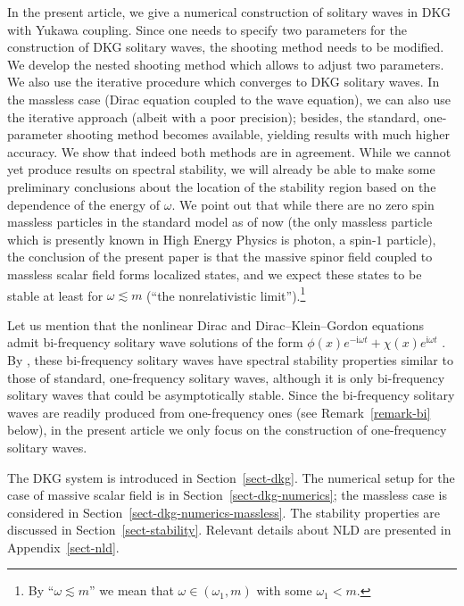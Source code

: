 \documentclass[12pt]{extarticle}
\newcommand{\jj}{\mathrm{i}}
\theoremstyle{plain}
\theoremstyle{remark}
\begin{document}
In the present article,
we give a numerical construction
of solitary waves
in DKG with Yukawa coupling.
Since one needs to specify two parameters
for the construction of DKG solitary waves,
the shooting method needs to be modified.
We develop the nested shooting method
which allows to adjust two parameters.
We also use the iterative procedure
which converges to DKG solitary waves.
In the massless case
(Dirac equation coupled to the wave equation),
we can also use the iterative approach
(albeit with a poor precision);
besides, the standard,
one-parameter shooting method
becomes available,
yielding results with much higher
accuracy.
We show that indeed both methods
are in agreement.
While we cannot yet produce
results on spectral stability,
we will already be able to make
some preliminary conclusions
about the location of the stability region
based on the dependence of the energy
of $\omega$.
We point out that while
there are no zero spin massless particles
in the standard model as of now
(the only massless particle
which is presently known
in High Energy Physics
is photon, a spin-$1$ particle),
the conclusion of the present paper is that
the massive spinor field coupled to massless
scalar field
forms localized states,
and we expect these states
to be stable
at least for
$\omega\lesssim m$
(``the nonrelativistic limit'').\footnote{
By ``$\omega\lesssim m$'' we mean that
$\omega\in(\omega_1,m)$
with some $\omega_1<m$.
}


Let us mention that the nonlinear Dirac and Dirac--Klein--Gordon equations
admit bi-frequency solitary wave solutions
of the form
$\phi(x)e^{-\jj\omega t} + \chi(x)e^{\jj\omega t}$
\cite{boussaid2018spectral}.
By
\cite{boussaid2024spectral,comech2025stable},
these bi-frequency solitary waves
have spectral stability properties
similar to those of standard, one-frequency solitary waves,
although it is only bi-frequency solitary waves that could be asymptotically stable.
Since the bi-frequency solitary waves
are readily produced
from one-frequency ones
(see Remark~\ref{remark-bi}
below),
in the present article we only
focus on the construction of
one-frequency solitary waves.


The DKG system is introduced in
Section~\ref{sect-dkg}.
The numerical setup for the case
of massive scalar field
is in Section~\ref{sect-dkg-numerics};
the massless case is considered in
Section~\ref{sect-dkg-numerics-massless}.
The stability properties
are discussed in Section~\ref{sect-stability}.
Relevant details about NLD
are presented in Appendix~\ref{sect-nld}.
\end{document}
